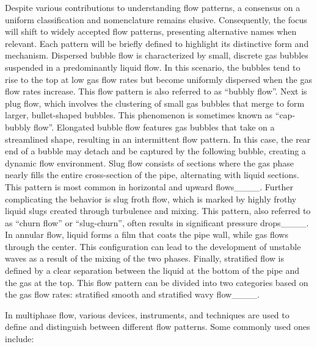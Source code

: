 Despite various contributions to understanding flow patterns, a consensus on a uniform classification and nomenclature remains elusive. Consequently, the focus will shift to widely accepted flow patterns, presenting alternative names when relevant. Each pattern will be briefly defined to highlight its distinctive form and mechanism. Dispersed bubble flow is characterized by small, discrete gas bubbles suspended in a predominantly liquid flow. In this scenario, the bubbles tend to rise to the top at low gas flow rates but become uniformly dispersed when the gas flow rates increase. This flow pattern is also referred to as ``bubbly flow''. Next is plug flow, which involves the clustering of small gas bubbles that merge to form larger, bullet-shaped bubbles. This phenomenon is sometimes known as ``cap-bubbly flow''. Elongated bubble flow features gas bubbles that take on a streamlined shape, resulting in an intermittent flow pattern. In this case, the rear end of a bubble may detach and be captured by the following bubble, creating a dynamic flow environment. Slug flow consists of sections where the gas phase nearly fills the entire cross-section of the pipe, alternating with liquid sections. This pattern is most common in horizontal and upward flows____. Further complicating the behavior is slug froth flow, which is marked by highly frothy liquid slugs created through turbulence and mixing. This pattern, also referred to as ``churn flow'' or ``slug-churn'', often results in significant pressure drops____. In annular flow, liquid forms a film that coats the pipe wall, while gas flows through the center. This configuration can lead to the development of unstable waves as a result of the mixing of the two phases. Finally, stratified flow is defined by a clear separation between the liquid at the bottom of the pipe and the gas at the top. This flow pattern can be divided into two categories based on the gas flow rates: stratified smooth and stratified wavy flow____.

In multiphase flow, various devices, instruments, and techniques are used to define and distinguish between different flow patterns. Some commonly used ones include:

